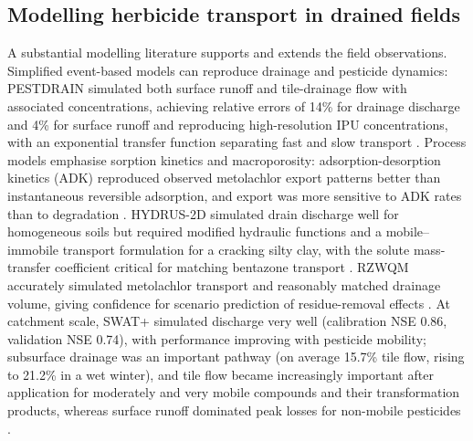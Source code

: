 \subsection{Modelling herbicide transport in drained fields}
A substantial modelling literature supports and extends the field observations. Simplified event-based models can reproduce drainage and pesticide dynamics: PESTDRAIN simulated both surface runoff and tile-drainage flow with associated concentrations, achieving relative errors of 14\% for drainage discharge and 4\% for surface runoff and reproducing high-resolution IPU concentrations, with an exponential transfer function separating fast and slow transport \parencite{Branger2009}. Process models emphasise sorption kinetics and macroporosity: adsorption-desorption kinetics (ADK) reproduced observed metolachlor export patterns better than instantaneous reversible adsorption, and export was more sensitive to ADK rates than to degradation \parencite{Novak2003}. HYDRUS-2D simulated drain discharge well for homogeneous soils but required modified hydraulic functions and a mobile--immobile transport formulation for a cracking silty clay, with the solute mass-transfer coefficient critical for matching bentazone transport \parencite{Boivin2006}. RZWQM accurately simulated metolachlor transport and reasonably matched drainage volume, giving confidence for scenario prediction of residue-removal effects \parencite{Shipitalo2016}. At catchment scale, SWAT+ simulated discharge very well (calibration NSE 0.86, validation NSE 0.74), with performance improving with pesticide mobility; subsurface drainage was an important pathway (on average 15.7\% tile flow, rising to 21.2\% in a wet winter), and tile flow became increasingly important after application for moderately and very mobile compounds and their transformation products, whereas surface runoff dominated peak losses for non-mobile pesticides \parencite{Wendell2024}.


